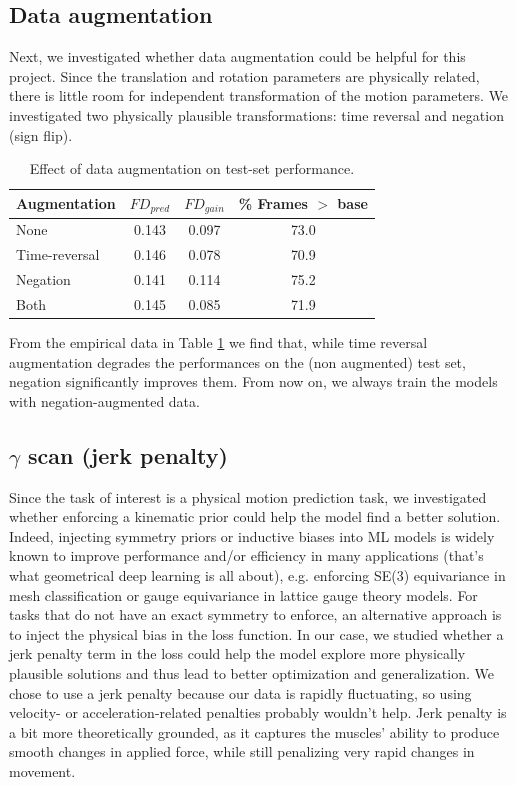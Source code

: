 \documentclass[
reprint,
aps,
prd,
superscriptaddress,
nofootinbib
]{revtex4-2}
\begin{document}
\subsection{Data augmentation}

Next, we investigated whether data augmentation could be helpful for this project. Since the translation and rotation parameters are physically related, there is little room for independent transformation of the motion parameters. We investigated two physically plausible transformations: time reversal and negation (sign flip). 

\begin{table}[ht]
\centering
\caption{Effect of data augmentation on test-set performance.}
\label{tab:augmentation}
\small
\begin{tabular}{l c c c}
\toprule
Augmentation & $FD_{pred}$ & $FD_{gain}$ & \% Frames $>$ base \\
\midrule
None & 0.143 & 0.097 & 73.0 \\
Time-reversal & 0.146 & 0.078 & 70.9  \\
Negation & 0.141 & 0.114 & 75.2  \\
Both & 0.145 & 0.085 & 71.9  \\
\bottomrule
\end{tabular}
\end{table}

From the empirical data in Table \ref{tab:augmentation} we find that, while time reversal augmentation degrades the performances on the (non augmented) test set, negation significantly improves them. From now on, we always train the models with negation-augmented data.


\subsection{$\gamma$ scan (jerk penalty)}


Since the task of interest is a physical motion prediction task, we investigated whether enforcing a kinematic prior could help the model find a better solution. Indeed, injecting symmetry priors or inductive biases into ML models is widely known to improve performance and/or efficiency in many applications (that's what geometrical deep learning is all about), e.g. enforcing SE(3) equivariance in mesh classification or gauge equivariance in lattice gauge theory models.
For tasks that do not have an exact symmetry to enforce, an alternative approach is to inject the physical bias in the loss function. In our case, we studied whether a jerk penalty term in the loss could help the model explore more physically plausible solutions and thus lead to better optimization and generalization. We chose to use a jerk penalty because our data is rapidly fluctuating, so using velocity- or acceleration-related penalties probably wouldn't help. Jerk penalty is a bit more theoretically grounded, as it captures the muscles' ability to produce smooth changes in applied force, while still penalizing very rapid changes in movement.
\end{document}
